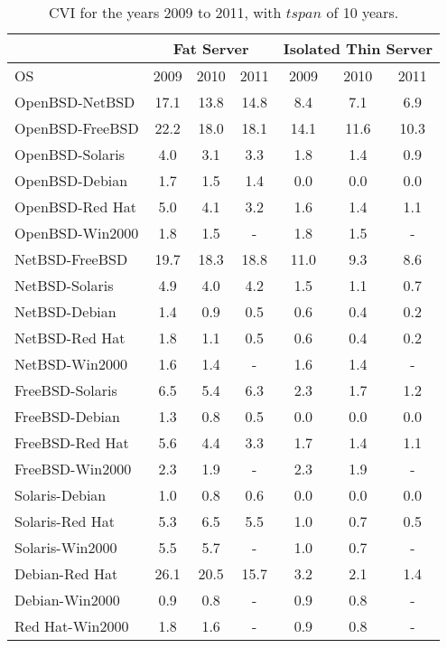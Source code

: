 \begin{table}[!ht]
\caption{CVI for the years 2009 to 2011, with $\mathit{tspan}$ of 10 years.}
\label{tab:cvi-2011-2009}
\begin{center}
{\scriptsize
\begin{tabular}{|l|c c c|| c c c |}
\cline{2-7}
\multicolumn{1}{c}{} &  \multicolumn{3}{|c||}{\textbf{Fat Server}}  &  \multicolumn{3}{|c|}{\textbf{Isolated Thin Server}} \\ \hline
OS             & 2009 &	2010 & 	2011        & 	2009 & 	2010 & 2011 \\ \hline
OpenBSD-NetBSD  & 17.1 & 13.8 & 14.8        & 8.4 & 7.1 & 6.9   \\
OpenBSD-FreeBSD & 22.2 & 18.0 & 18.1        & 14.1  & 11.6 & 10.3  \\
OpenBSD-Solaris & 4.0 & 3.1 & 3.3           &  1.8 & 1.4 & 0.9  \\
OpenBSD-Debian  & 1.7 & 1.5 & 1.4           &  0.0 & 0.0 & 0.0  \\
OpenBSD-Red Hat & 5.0 & 4.1 & 3.2           &  1.6 & 1.4 & 1.1  \\
OpenBSD-Win2000 & 1.8 & 1.5 & -             &  1.8 & 1.5 & -  \\  \hline
NetBSD-FreeBSD  & 19.7 & 18.3 & 18.8        & 11.0 & 9.3 & 8.6 \\
NetBSD-Solaris  & 4.9 & 4.0 & 4.2           &  1.5 & 1.1 & 0.7  \\
NetBSD-Debian   & 1.4 & 0.9 & 0.5           &  0.6 & 0.4 & 0.2  \\
NetBSD-Red Hat  & 1.8 & 1.1 & 0.5           &  0.6 & 0.4 & 0.2  \\
NetBSD-Win2000  & 1.6 & 1.4 & -             & 1.6 & 1.4 & -   \\ \hline
FreeBSD-Solaris & 6.5 & 5.4 & 6.3           & 2.3 & 1.7 & 1.2  \\
FreeBSD-Debian  & 1.3 & 0.8 & 0.5           & 0.0 & 0.0 & 0.0  \\
FreeBSD-Red Hat & 5.6 & 4.4 & 3.3           & 1.7 & 1.4 & 1.1  \\
FreeBSD-Win2000 & 2.3 & 1.9 & -             & 2.3 & 1.9 & -  \\ \hline
Solaris-Debian  & 1.0 & 0.8 & 0.6           & 0.0 & 0.0 & 0.0  \\
Solaris-Red Hat & 5.3 & 6.5 & 5.5           & 1.0 & 0.7 & 0.5  \\
Solaris-Win2000 & 5.5 & 5.7 & -             & 1.0 & 0.7 & -  \\ \hline
Debian-Red Hat  & 26.1 & 20.5 & 15.7        & 3.2 & 2.1 & 1.4  \\
Debian-Win2000  & 0.9 & 0.8 & -             & 0.9 & 0.8 & -   \\ \hline
Red Hat-Win2000 & 1.8 & 1.6 & -             & 0.9 & 0.8 & -   \\ \hline
\end{tabular}
}
\end{center}
\end{table}



